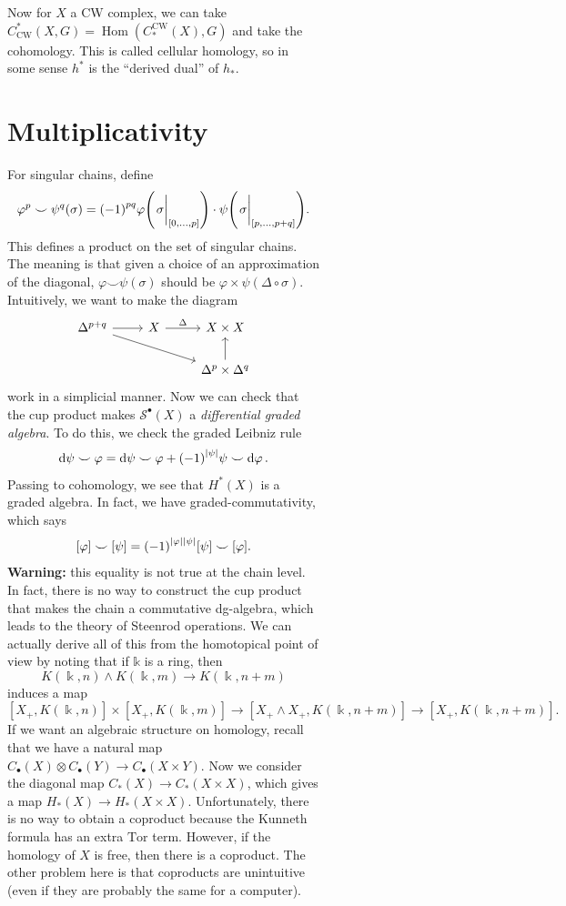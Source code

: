 \documentclass[leqno, openany]{memoir}
\theoremstyle{definition}
\theoremstyle{remark}
\theoremstyle{plain}
\theoremstyle{definition}
\theoremstyle{remark}
\renewcommand{\k}{\Bbbk}
\newcommand{\mc}[1]{\mathcal{#1}}
\newcommand{\mr}[1]{\mathrm{#1}}
\DeclareMathOperator{\Hom}{Hom}
\begin{document}
\begin{figure}[H]
\begin{figure}[H]
Now for $X$ a CW complex, we can take $C_{\mr{CW}}^*(X, G) =
\Hom(C_*^{\mr{CW}}(X), G)$ and take the cohomology. This is called cellular
homology, so in some sense $h^*$ is the ``derived dual'' of $h_*$.

\section{Multiplicativity}%

For singular chains, define \[ \varphi^p \smile \psi^q (\sigma) = {(-1)}^{pq}
\varphi\qty(\eval{\sigma}_{[0, \ldots, p]}) \cdot \psi\qty(\eval{\sigma}_{[p,
\ldots, p+q]}). \] This defines a product on the set of singular chains. The
meaning is that given a choice of an approximation of the diagonal, $\varphi
\smile \psi (\sigma)$ should be $\varphi \times \psi (\Delta \circ \sigma)$.
Intuitively, we want to make the diagram \begin{equation*} \begin{tikzcd}
\Delta^{p+q} \arrow{r} \arrow{drr} & X \arrow{r}{\Delta} & X \times X \\ & &
\Delta^p \times \Delta^q \arrow{u} \end{tikzcd} \end{equation*} work in a
simplicial manner. Now we can check that the cup product makes
$\mc{S}^{\bullet}(X)$ a \textit{differential graded algebra}. To do this, we
check the graded Leibniz rule \[ \dd{\psi \smile \varphi} = \dd{\psi} \smile
\varphi + {(-1)}^{\abs{\psi}} \psi \smile \dd{\varphi}. \] Passing to
cohomology, we see that $H^*(X)$ is a graded algebra. In fact, we have
graded-commutativity, which says \[ [\varphi] \smile [\psi] =
{(-1)}^{\abs{\varphi}\abs{\psi}} [\psi] \smile [\varphi]. \] \textbf{Warning:}
this equality is not true at the chain level. In fact, there is no way to
construct the cup product that makes the chain a commutative dg-algebra, which
leads to the theory of Steenrod operations. We can actually derive all of this
from the homotopical point of view by noting that if $\mathbb{k}$ is a ring,
then \[ K(\k, n) \wedge K(\k, m) \to K(\k, n+m) \] induces a map \[ [X_+, K(\k,
n)] \times [X_+, K(\k, m)] \to [X_+ \wedge X_+, K(\k, n+m)] \to [X_+, K(\k,
n+m)]. \] If we want an algebraic structure on homology, recall that we have a
natural map $C_{\bullet}(X) \otimes C_{\bullet}(Y) \to C_{\bullet}(X \times
Y)$. Now we consider the diagonal map $C_*(X) \to C_*(X \times X)$, which gives
a map $H_*(X) \to H_*(X \times X)$. Unfortunately, there is no way to obtain a
coproduct because the Kunneth formula has an extra $\mr{Tor}$ term. However, if
the homology of $X$ is free, then there is a coproduct. The other problem here
is that coproducts are unintuitive (even if they are probably the same for a
computer). 


\end{figure}
\end{figure}
\end{document}
